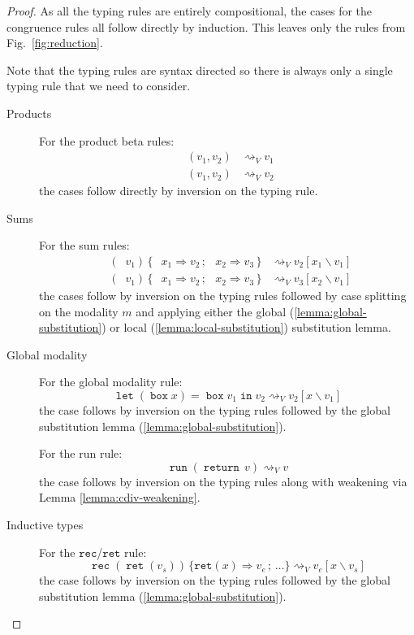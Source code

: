 \documentclass[acmsmall, screen, review, anonymous]{acmart}
\theoremstyle{definition}
\newcommand{\retname}{\mathtt{ret}}
\newcommand{\ret}[1]{\mathop{\retname}(#1)}
\newcommand{\indelimname}{\mathtt{rec}}
\newcommand{\indelim}[2]{\mathop{\indelimname} #1 \,\{#2\}}
\newcommand{\indretcase}[2]{\retname(#1) \Rightarrow #2}
\newcommand{\seq}{\,;\,}
\newcommand{\fstname}{\mathop{\pi_1}}
\newcommand{\fst}[1]{\fstname #1}
\newcommand{\sndname}{\mathop{\pi_2}}
\newcommand{\snd}[1]{\sndname #1}
\newcommand{\inlname}{\mathop{\mathtt{in}_L}}
\newcommand{\inl}[1]{\inlname #1}
\newcommand{\inrname}{\mathop{\mathtt{in}_R}}
\newcommand{\inr}[1]{\inrname #1}
\newcommand{\casename}{\mathtt{case}}
\newcommand{\casemname}{\casename^{m}}
\newcommand{\casem}[5]{\mathop{\casemname} #1 \,\{\,\inl{#2} \Rightarrow #3 \seq \inr{#4} \Rightarrow #5 \,\}}
\newcommand{\returnname}{\mathop{\mathtt{return}}}
\newcommand{\return}[1]{\returnname\, #1}
\newcommand{\gboxname}{\mathop{\mathtt{box}}}
\newcommand{\gbox}[1]{\gboxname #1}
\newcommand{\gunbox}[3]{\mathop{\mathtt{let}} (\gbox{#1}) = #2 \mathop{\mathtt{in}} #3}
\newcommand{\grunname}{\mathtt{run}}
\newcommand{\grun}[1]{\mathop{\grunname}(#1)}
\newcommand{\sub}[2]{[#1\backslash#2]}
\newcommand{\sbst}[3]{#1\sub{#2}{#3}}
\newcommand{\stepstoname}{\rightsquigarrow}
\newcommand{\stepstov}{\stepstoname_V}
\begin{document}
\begin{proof}
As all the typing rules are entirely compositional, the cases for the
congruence rules all follow directly by induction. This leaves only the
rules from Fig.~\ref{fig:reduction}.

Note that the typing rules are syntax directed so there is always only a
single typing rule that we need to consider.

\begin{description}
\item[Products] For the product beta rules:
\begin{align*}
\fst{(v_1, v_2)} &\stepstov v_1 \\
\snd{(v_1, v_2)} &\stepstov v_2
\end{align*}
the cases follow directly by inversion on the typing rule.

\item[Sums] For the sum rules:
\begin{align*}
\casem{(\inl{v_1})}{x_1}{v_2}{x_2}{v_3} &\stepstov \sbst{v_2}{x_1}{v_1} \\
\casem{(\inr{v_1})}{x_1}{v_2}{x_2}{v_3} &\stepstov \sbst{v_3}{x_2}{v_1}
\end{align*}
the cases follow by inversion on the typing rules followed by case
splitting on the modality $m$ and applying either the global
(\ref{lemma:global-substitution}) or local
(\ref{lemma:local-substitution}) substitution lemma.

\item[Global modality] For the global modality rule:
\begin{equation*}
\gunbox{x}{\gbox{v_1}}{v_2} \stepstov \sbst{v_2}{x}{v_1}
\end{equation*}
the case follows by inversion on the typing rules followed by the global
substitution lemma (\ref{lemma:global-substitution}).

For the run rule:
\begin{equation*}
\grun{\return{v}} \stepstov v
\end{equation*}
the case follows by inversion on the typing rules along with weakening
via Lemma \ref{lemma:cdiv-weakening}.

\item[Inductive types]
For the $\indelimname$/$\retname$ rule:
\begin{equation*}
\indelim{(\ret{v_s})}{\indretcase{x}{v_e} \seq \ldots} \stepstov \sbst{v_e}{x}{v_s}
\end{equation*}
the case follows by inversion on the typing rules followed by the global
substitution lemma (\ref{lemma:global-substitution}).


\end{description}
\end{proof}
\end{document}
